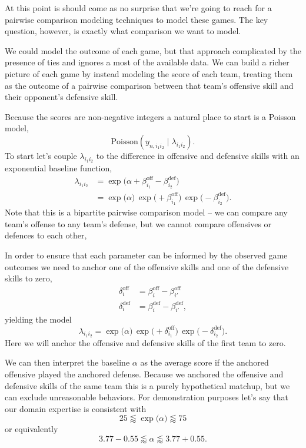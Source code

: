 \documentclass[
  letterpaper,
  DIV=11,
  numbers=noendperiod]{scrartcl}
\begin{document}
At this point is should come as no surprise that we're going to reach
for a pairwise comparison modeling techniques to model these games. The
key question, however, is exactly what comparison we want to model.

We could model the outcome of each game, but that approach complicated
by the presence of ties and ignores a most of the available data. We can
build a richer picture of each game by instead modeling the score of
each team, treating them as the outcome of a pairwise comparison between
that team's offensive skill and their opponent's defensive skill.

Because the scores are non-negative integers a natural place to start is
a Poisson model, \[
\text{Poisson}(y_{n, i_{1} i_{2}} \mid \lambda_{i_{1} i_{2}} ).
\] To start let's couple \(\lambda_{i_{1} i_{2}}\) to the difference in
offensive and defensive skills with an exponential baseline function,
\begin{align*}
\lambda_{i_{1} i_{2}}
&=
\exp \big(  \alpha
           + \beta_{i_{1}}^{\mathrm{off}}
           - \beta_{i_{2}}^{\mathrm{def}} \big)
\\
&=
\exp \big(   \alpha \big) \,
\exp \big( + \beta_{i_{1}}^{\mathrm{off}} \big) \,
\exp \big( - \beta_{i_{2}}^{\mathrm{def}} \big).
\end{align*} Note that this is a bipartite pairwise comparison model --
we can compare any team's offense to any team's defense, but we cannot
compare offensives or defences to each other,

In order to ensure that each parameter can be informed by the observed
game outcomes we need to anchor one of the offensive skills and one of
the defensive skills to zero, \begin{align*}
\delta_{i}^{\mathrm{off}}
&=
\beta_{i}^{\mathrm{off}} - \beta_{i'}^{\mathrm{off}}
\\
\delta_{i}^{\mathrm{def}}
&=
\beta_{i}^{\mathrm{def}} - \beta_{i'}^{\mathrm{def}},
\end{align*} yielding the model \[
\lambda_{i_{1} i_{2}}
=
\exp \big(   \alpha \big) \,
\exp \big( + \delta_{i_{1}}^{\mathrm{off}} \big) \,
\exp \big( - \delta_{i_{2}}^{\mathrm{def}} \big).
\] Here we will anchor the offensive and defensive skills of the first
team to zero.

We can then interpret the baseline \(\alpha\) as the average score if
the anchored offensive played the anchored defense. Because we anchored
the offensive and defensive skills of the same team this is a purely
hypothetical matchup, but we can exclude unreasonable behaviors. For
demonstration purposes let's say that our domain expertise is consistent
with \[
25 \lessapprox  \exp \big( \alpha \big) \lessapprox 75
\] or equivalently \[
3.77 - 0.55 \lessapprox \alpha \lessapprox 3.77 + 0.55.
\]
\end{document}
